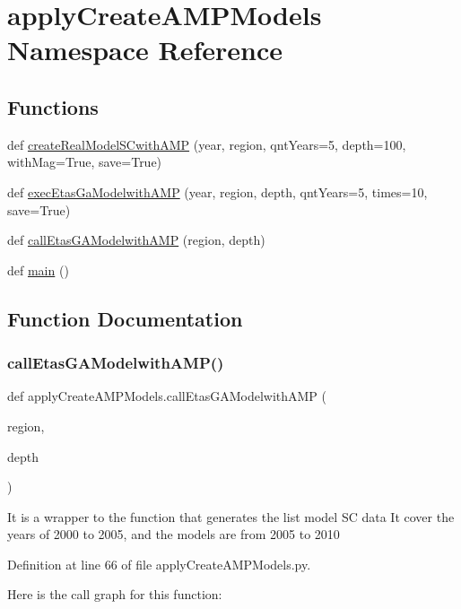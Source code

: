 \hypertarget{namespaceapply_create_a_m_p_models}{}\section{apply\+Create\+A\+M\+P\+Models Namespace Reference}
\label{namespaceapply_create_a_m_p_models}
\subsection*{Functions}
\begin{DoxyCompactItemize}
\item 
def \hyperlink{namespaceapply_create_a_m_p_models_abf328c55862138dc2a32af58c28de8d1}{create\+Real\+Model\+S\+Cwith\+A\+MP} (year, region, qnt\+Years=5, depth=100, with\+Mag=True, save=True)
\item 
def \hyperlink{namespaceapply_create_a_m_p_models_a338707b5b3fbd706fbb599ff60145d77}{exec\+Etas\+Ga\+Modelwith\+A\+MP} (year, region, depth, qnt\+Years=5, times=10, save=True)
\item 
def \hyperlink{namespaceapply_create_a_m_p_models_a1500ee676e5aada8983e02f2fa52d546}{call\+Etas\+G\+A\+Modelwith\+A\+MP} (region, depth)
\item 
def \hyperlink{namespaceapply_create_a_m_p_models_a97988a79aa6236281d12488f40740402}{main} ()
\end{DoxyCompactItemize}


\subsection{Function Documentation}
\mbox{\label{namespaceapply_create_a_m_p_models_a1500ee676e5aada8983e02f2fa52d546}} 
\subsubsection{\texorpdfstring{call\+Etas\+G\+A\+Modelwith\+A\+M\+P()}{callEtasGAModelwithAMP()}}
{\footnotesize\ttfamily def apply\+Create\+A\+M\+P\+Models.\+call\+Etas\+G\+A\+Modelwith\+A\+MP (\begin{DoxyParamCaption}\item[{}]{region,  }\item[{}]{depth }\end{DoxyParamCaption})}

\begin{DoxyVerb}It is a wrapper to the function that generates the list model SC data
It cover the years of 2000 to 2005, and the models are from 2005 to 2010
\end{DoxyVerb}
 

Definition at line 66 of file apply\+Create\+A\+M\+P\+Models.\+py.

Here is the call graph for this function\+:
